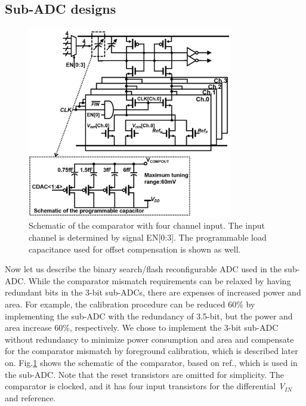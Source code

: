 
\subsection{Sub-ADC designs}

\begin{figure}
\centering
  \includegraphics[width=0.8\textwidth]{figure/chap3/fig14.jpg}
  \caption{Schematic of the comparator with four channel input. The input channel is determined by signal EN[0:3]. The programmable load capacitance used for offset compensation is shown as well.}
  \label{fig-3-14}
\end{figure}

Now let us describe the binary search/flash reconfigurable ADC used in the sub-ADC. While the comparator mismatch requirements can be relaxed by having redundant bits in the 3-bit sub-ADCs, there are expenses of increased power and area. For example, the calibration procedure can be reduced 60\% by implementing the sub-ADC with the redundancy of 3.5-bit, but the power and area increase 60\%, respectively. We chose to implement the 3-bit sub-ADC without redundancy to minimize power consumption and area and compensate for the comparator mismatch by foreground calibration, which is described later on. Fig.\ref{fig-3-14} shows the schematic of the comparator, based on ref.\cite{proesel20108}, which is used in the sub-ADC. Note that the reset transistors are omitted for simplicity. The comparator is clocked, and it has four input transistors for the differential \textit{V${}_{IN}$} and reference. 


